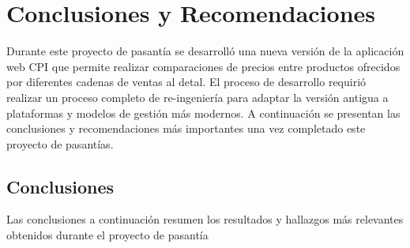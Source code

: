 \chapter*{Conclusiones y Recomendaciones}
Durante este proyecto de pasantía se desarrolló una nueva versión de la aplicación web CPI que permite realizar comparaciones de precios entre productos ofrecidos por diferentes cadenas de ventas al detal. El proceso de desarrollo requirió realizar un proceso completo de re-ingeniería para adaptar la versión antigua a plataformas y modelos de gestión más modernos. A continuación se presentan las conclusiones y recomendaciones más importantes una vez completado este proyecto de pasantías.

\section{Conclusiones}
Las conclusiones a continuación resumen los resultados y hallazgos más relevantes obtenidos durante el proyecto de pasantía
